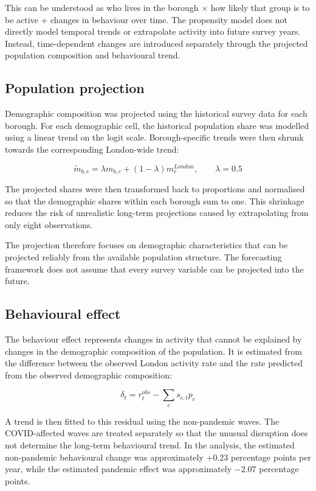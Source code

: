 \documentclass[ %
                    author={Ashrey Ashrey, Sanya Kapoor, Trisha Sharma, Yash Bhooshan Pandloskar},
                supervisor={Dr. Dalila O’Grady},
                    degree={MSc},
                     title={Using machine learning to forecast physical activity participation, volunteering and activity patterns in London},
                  subtitle={},
                      type={},
                      year={2021}]{dissertation}
\begin{document}
This can be understood as who lives in the borough \(\times\) how likely that group is to be active + changes in behaviour over time. The propensity model does not directly model temporal trends or extrapolate activity into future survey years. Instead, time-dependent changes are introduced separately through the projected population composition and behavioural trend.

\FloatBarrier
\subsection{Population projection}

\noindent
Demographic composition was projected using the historical survey data for each borough. For each demographic cell, the historical population share was modelled using a linear trend on the logit scale. Borough-specific trends were then shrunk towards the corresponding London-wide trend:

\[
\widetilde{m}_{b,c}
=
\lambda m_{b,c}
+
(1-\lambda)m_c^{London},
\qquad
\lambda=0.5
\]

The projected shares were then transformed back to proportions and normalised so that the demographic shares within each borough sum to one. This shrinkage reduces the risk of unrealistic long-term projections caused by extrapolating from only eight observations.

The projection therefore focuses on demographic characteristics that can be projected reliably from the available population structure. The forecasting framework does not assume that every survey variable can be projected into the future.

\FloatBarrier
\subsection{Behavioural effect}

\noindent
The behaviour effect represents changes in activity that cannot be explained by changes in the demographic composition of the population. It is estimated from the difference between the observed London activity rate and the rate predicted from the observed demographic composition:

\[
\delta_t
=
r_t^{obs}
-
\sum_c s_{c,t}p_c
\]

A trend is then fitted to this residual using the non-pandemic waves. The COVID-affected waves are treated separately so that the unusual disruption does not determine the long-term behavioural trend. In the analysis, the estimated non-pandemic behavioural change was approximately +0.23 percentage points per year, while the estimated pandemic effect was approximately $-2.07$ percentage points.
\end{document}
